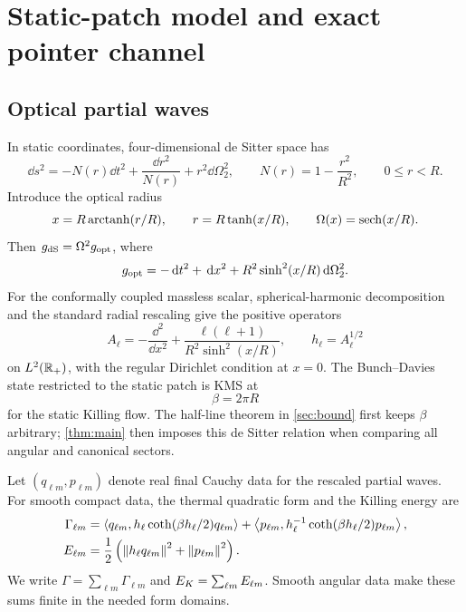 \section{Static-patch model and exact pointer channel}
\label{sec:model}

\subsection{Optical partial waves}

In static coordinates, four-dimensional de Sitter space has
\begin{equation}
 \dd s^2=-N(r)\dd t^2+\frac{\dd r^2}{N(r)}+r^2\dd\Omega_2^2,
 \qquad N(r)=1-\frac{r^2}{R^2},
 \qquad 0\leq r<R .
 \label{eq:static-metric}
\end{equation}
Introduce the optical radius
\begin{equation}
 x=R\operatorname{arctanh}(r/R),
 \qquad r=R\tanh(x/R),
 \qquad \Omega(x)=\operatorname{sech}(x/R).
 \label{eq:optical-radius}
\end{equation}
Then $g_{\rm dS}=\Omega^2g_{\rm opt}$, where
\begin{equation}
 g_{\rm opt}=-\,\mathrm d t^2+\,\mathrm d x^2+R^2\sinh^2(x/R)\,\mathrm d\Omega_2^2 .
\end{equation}
For the conformally coupled massless scalar, spherical-harmonic decomposition
and the standard radial rescaling give the positive operators
\begin{equation}
 A_\ell=-\frac{\dd^2}{\dd x^2}
 +\frac{\ell(\ell+1)}{R^2\sinh^2(x/R)},
 \qquad h_\ell=A_\ell^{1/2}
 \label{eq:partial-wave-hamiltonian}
\end{equation}
on $L^2(\mathbb R_+)$, with the regular Dirichlet condition at $x=0$.
The Bunch--Davies state restricted to the static patch is KMS at
\begin{equation}
 \beta=2\pi R
 \label{eq:beta}
\end{equation}
for the static Killing flow.  The half-line theorem in \cref{sec:bound} first
keeps $\beta$ arbitrary; \cref{thm:main} then imposes this de Sitter relation
when comparing all angular and canonical sectors.

Let $(q_{\ell m},p_{\ell m})$ denote real final Cauchy data for the rescaled
partial waves.  For smooth compact data, the thermal quadratic form and the
Killing energy are
\begin{align}
 \Gamma_{\ell m}
 &=\left\langle q_{\ell m},h_\ell\coth(\beta h_\ell/2)q_{\ell m}\right\rangle
   +\left\langle p_{\ell m},h_\ell^{-1}\coth(\beta h_\ell/2)p_{\ell m}\right\rangle,
 \label{eq:gamma-sector}\\
 E_{\ell m}
 &=\frac12\left(\left\lVert h_\ell q_{\ell m}\right\rVert^2
                    +\left\lVert p_{\ell m}\right\rVert^2\right).
 \label{eq:energy-sector}
\end{align}
We write $\Gamma=\sum_{\ell m}\Gamma_{\ell m}$ and
$E_{K}=\sum_{\ell m}E_{\ell m}$.  Smooth angular data make these sums finite in
the needed form domains.

